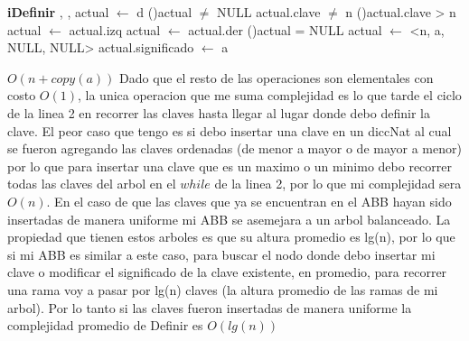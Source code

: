 \begin{Algoritmos}
\begin{algoritmo}{\textbf{iDefinir}}{ , , }{}
			actual $\leftarrow$ d 
            \While(){actual $\neq$ NULL \yluego actual.clave $\neq$ n}{
            	\eIf(){actual.clave > n}{
                	actual $\leftarrow$ actual.izq 
                }{
                	actual $\leftarrow$ actual.der 
                }
                }
            \eIf(){actual = NULL}{    
            actual $\leftarrow$ <n, a, NULL, NULL>            
            }{
            actual.significado $\leftarrow$ a 
            }
\end{algoritmo}
\datosAlgoritmo{} %
  {} %
  {} %
  {$O(n + copy(a))$} %
  {Dado que el resto de las operaciones son elementales con costo $O(1)$, la unica operacion que me suma complejidad es lo que tarde el ciclo de la linea 2 en recorrer las claves hasta llegar al lugar donde debo definir la clave. El peor caso que tengo es si debo insertar una clave en un diccNat al cual se fueron agregando las claves ordenadas (de menor a mayor o de mayor a menor) por lo que para insertar una clave que es un maximo o un minimo debo recorrer todas las claves del arbol en el $while$ de la linea 2, por lo que mi complejidad sera $O(n)$. En el caso de que las claves que ya se encuentran en el ABB hayan sido insertadas de manera uniforme mi ABB se asemejara a un arbol balanceado. La propiedad que tienen estos arboles es que su altura promedio es lg(n), por lo que si mi ABB es similar a este caso, para buscar el nodo donde debo insertar mi clave o modificar el significado de la clave existente, en promedio, para recorrer una rama voy a pasar por lg(n) claves (la altura promedio de las ramas de mi arbol). Por lo tanto si las claves fueron insertadas de manera uniforme la complejidad promedio de Definir es $O(lg(n))$ } %


\end{Algoritmos}
